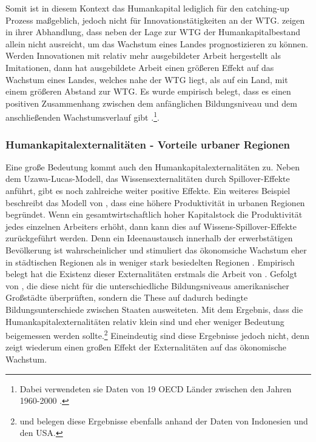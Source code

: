 %
Somit ist in diesem Kontext das Humankapital lediglich für den catching-up Prozess maßgeblich, jedoch nicht für Innovationstätigkeiten an der WTG. \cite{Krueger.2001} zeigen in ihrer Abhandlung, dass neben der Lage zur WTG  der Humankapitalbestand allein nicht ausreicht, um das Wachstum eines Landes prognostizieren zu können.\\
%
Werden Innovationen mit relativ mehr ausgebildeter Arbeit hergestellt als Imitationen, dann hat ausgebildete Arbeit einen größeren Effekt auf das Wachstum eines Landes, welches nahe der WTG liegt, als auf ein Land, mit einem größeren Abstand zur WTG. Es wurde empirisch belegt, dass es einen positiven Zusammenhang zwischen dem anfänglichen Bildungsniveau und dem anschließenden Wachstumsverlauf gibt \cite{Vandenbussche.2006}.\footnote{Dabei verwendeten sie Daten von 19 OECD Länder zwischen den Jahren 1960-2000 \cite{Vandenbussche.2006}.}.
%
\subsubsection*{Humankapitalexternalitäten - Vorteile urbaner Regionen}
Eine große Bedeutung kommt auch den Humankapitalexternalitäten zu. Neben dem Uzawa-Lucas-Modell, das Wissensexternalitäten durch Spillover-Effekte anführt, gibt es noch zahlreiche weiter positive Effekte. Ein weiteres Beispiel beschreibt das Modell von \cite{Jacobs.1970}, dass eine höhere Produktivität in urbanen Regionen begründet.
Wenn ein gesamtwirtschaftlich hoher Kapitalstock die Produktivität jedes einzelnen Arbeiters erhöht, dann kann dies auf Wissens-Spillover-Effekte zurückgeführt werden. Denn ein Ideenaustausch innerhalb der erwerbstätigen Bevölkerung ist wahrscheinlicher und stimuliert das ökonomsiche Wachstum eher in städtischen Regionen als in weniger stark besiedelten Regionen \cite{Azariades.1990,Lucas.1988}. Empirisch belegt hat die Existenz dieser Externalitäten erstmals die Arbeit von \cite{Rauch.}. Gefolgt von \cite{Acemoglu.2000}, die diese nicht für die unterschiedliche Bildungsniveaus amerikanischer Großstädte überprüften, sondern die These auf dadurch bedingte Bildungsunterschiede zwischen Staaten ausweiteten. Mit dem Ergebnis, dass die Humankapitalexternalitäten relativ klein sind und eher weniger Bedeutung beigemessen werden sollte.\footnote{\cite{Duflo.2004} und \cite{Ciccone.Apr} belegen diese Ergebnisse ebenfalls anhand der Daten von Indonesien und den USA.} Eineindeutig sind diese Ergebnisse jedoch nicht, denn \cite{Moretti.2004} zeigt wiederum einen großen Effekt der Externalitäten auf das ökonomische Wachstum.
